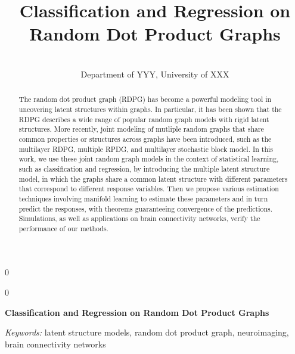 \documentclass[12pt]{article}
\newcommand{\blind}{0}
\begin{document}
\def\spacingset#1{\renewcommand{\baselinestretch}%
{#1}\small\normalsize} \spacingset{1}



\blind
{
  \title{\bf Classification and Regression on Random Dot Product Graphs}

  \author{
         \\
    Department of YYY, University of XXX\\
      }
  \maketitle
} \fi

\blind
{
  \bigskip
  \bigskip
  \bigskip
  \begin{center}
    {\LARGE\bf Classification and Regression on Random Dot Product
Graphs}
  \end{center}
  \medskip
} \fi

\bigskip
\begin{abstract}
The random dot product graph (RDPG) has become a powerful modeling tool
in uncovering latent structures within graphs. In particular, it has
been shown that the RDPG describes a wide range of popular random graph
models with rigid latent structures. More recently, joint modeling of
mutliple random graphs that share common properties or structures across
graphs have been introduced, such as the multilayer RDPG, multiple RPDG,
and multilayer stochastic block model. In this work, we use these joint
random graph models in the context of statistical learning, such as
classification and regression, by introducing the multiple latent
structure model, in which the graphs share a common latent structure
with different parameters that correspond to different response
variables. Then we propose various estimation techniques involving
manifold learning to estimate these parameters and in turn predict the
responses, with theorems guaranteeing convergence of the predictions.
Simulations, as well as applications on brain connectivity networks,
verify the performance of our methods.
\end{abstract}

\noindent%
{\it Keywords:} latent structure models, random dot product
graph, neuroimaging, brain connectivity networks

\vfill

\newpage
\spacingset{1.9} %
\end{document}

